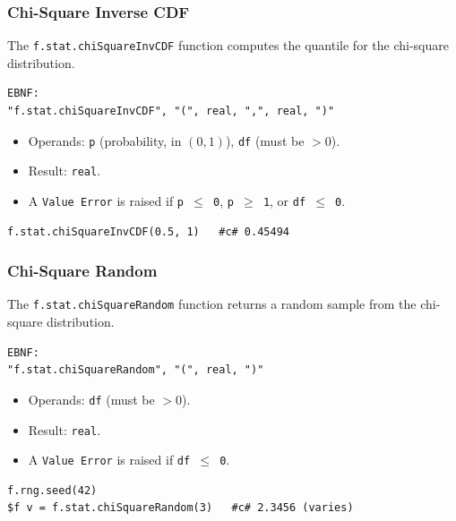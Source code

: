 \subsubsection{Chi-Square Inverse CDF}
The \texttt{f.stat.chiSquareInvCDF} function computes the quantile for the chi-square distribution.
\begin{verbatim}
EBNF:
"f.stat.chiSquareInvCDF", "(", real, ",", real, ")"
\end{verbatim}
\begin{itemize}
\item Operands: \texttt{p} (probability, in $(0, 1)$), \texttt{df} (must be $> 0$).
\item Result: \texttt{real}.
\item A \texttt{Value Error} is raised if \texttt{p $\leq$ 0}, \texttt{p $\geq$ 1}, or \texttt{df $\leq$ 0}.
\end{itemize}
\begin{verbatim}
f.stat.chiSquareInvCDF(0.5, 1)   #c# 0.45494
\end{verbatim}

\subsubsection{Chi-Square Random}
The \texttt{f.stat.chiSquareRandom} function returns a random sample from the chi-square distribution.
\begin{verbatim}
EBNF:
"f.stat.chiSquareRandom", "(", real, ")"
\end{verbatim}
\begin{itemize}
\item Operands: \texttt{df} (must be $> 0$).
\item Result: \texttt{real}.
\item A \texttt{Value Error} is raised if \texttt{df $\leq$ 0}.
\end{itemize}
\begin{verbatim}
f.rng.seed(42)
$f v = f.stat.chiSquareRandom(3)   #c# 2.3456 (varies)
\end{verbatim}

